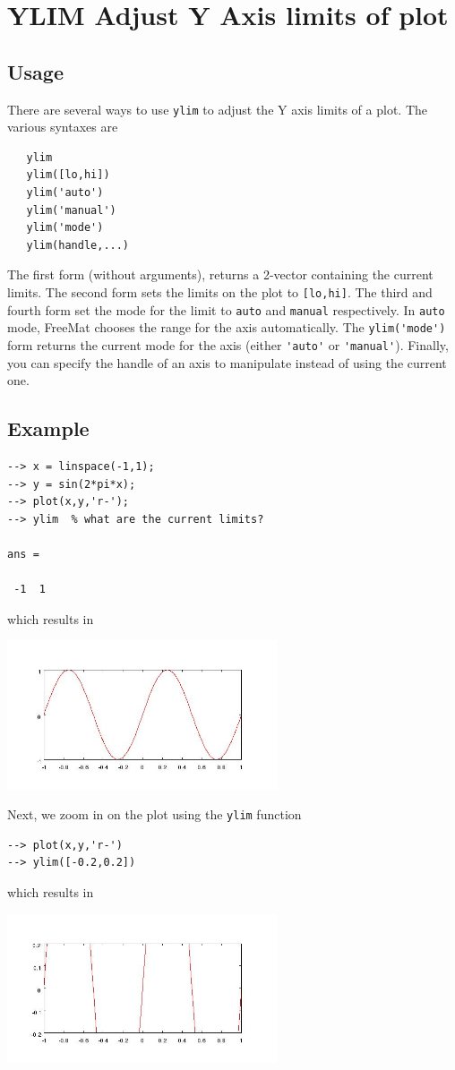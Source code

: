 \section{YLIM Adjust Y Axis limits of plot}

\subsection{Usage}

There are several ways to use \verb|ylim| to adjust the Y axis limits of
a plot.  The various syntaxes are
\begin{verbatim}
   ylim
   ylim([lo,hi])   
   ylim('auto')
   ylim('manual')
   ylim('mode')
   ylim(handle,...)
\end{verbatim}
The first form (without arguments), returns a 2-vector containing the
current limits.  The second form sets the limits on the plot to \verb|[lo,hi]|.
The third and fourth form set the mode for the limit to \verb|auto| and \verb|manual|
respectively.  In \verb|auto| mode, FreeMat chooses the range for the axis 
automatically.  The \verb|ylim('mode')| form returns the current mode for the axis
(either \verb|'auto'| or \verb|'manual'|).  Finally, you can specify the handle of an
axis to manipulate instead of using the current one.
\subsection{Example}

\begin{verbatim}
--> x = linspace(-1,1);
--> y = sin(2*pi*x);
--> plot(x,y,'r-');
--> ylim  % what are the current limits?

ans = 

 -1  1 
\end{verbatim}
which results in


\centerline{\includegraphics[width=8cm]{ylim1}}

Next, we zoom in on the plot using the \verb|ylim| function
\begin{verbatim}
--> plot(x,y,'r-')
--> ylim([-0.2,0.2])
\end{verbatim}
which results in


\centerline{\includegraphics[width=8cm]{ylim2}}

